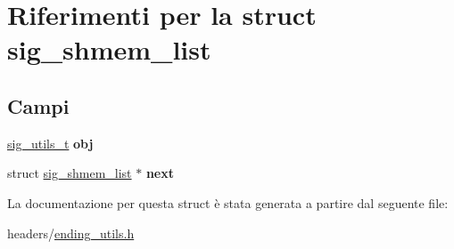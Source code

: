 \hypertarget{structsig__shmem__list}{}\section{Riferimenti per la struct sig\+\_\+shmem\+\_\+list}
\label{structsig__shmem__list}
\subsection*{Campi}
\begin{DoxyCompactItemize}
\item 
\mbox{\label{structsig__shmem__list_a988745914fe696370eea22407860cbe1}} 
\hyperlink{structsig__utils__t}{sig\+\_\+utils\+\_\+t} {\bfseries obj}
\item 
\mbox{\label{structsig__shmem__list_a8936a03d40f822a08973610b80304264}} 
struct \hyperlink{structsig__shmem__list}{sig\+\_\+shmem\+\_\+list} $\ast$ {\bfseries next}
\end{DoxyCompactItemize}


La documentazione per questa struct è stata generata a partire dal seguente file\+:\begin{DoxyCompactItemize}
\item 
headers/\hyperlink{ending__utils_8h}{ending\+\_\+utils.\+h}\end{DoxyCompactItemize}
